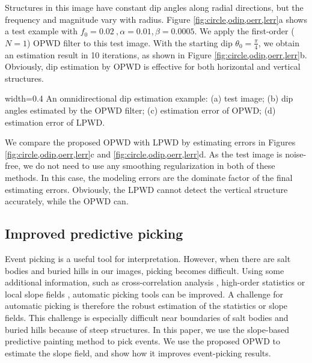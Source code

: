 Structures in this image have constant dip angles along radial directions,
but the frequency and magnitude vary with radius.
Figure \ref{fig:circle,odip,oerr,lerr}a shows a test example 
with $f_0=0.02~,\alpha=0.01,\beta=0.0005$. 
We apply the 
first-order ($N=1$) OPWD filter to this test image.
With the starting dip $\theta_0=\frac{\pi}{4}$,
we obtain an estimation result in 10 iterations,
as shown in Figure \ref{fig:circle,odip,oerr,lerr}b.
Obviously, dip estimation by OPWD is effective 
for both horizontal and vertical structures.

{width=0.4\textwidth}{
An omnidirectional dip estimation example:
(a) test image;
(b) dip angles estimated by the OPWD filter;
(c) estimation error of OPWD;
(d) estimation error of LPWD.
}


We compare the proposed OPWD with LPWD by 
estimating errors in Figures
\ref{fig:circle,odip,oerr,lerr}c and \ref{fig:circle,odip,oerr,lerr}d.
As the test image is noise-free, 
we do not need to use any smoothing regularization 
in both of these methods.
In this case, 
the modeling errors are the dominate factor of the final estimating errors.
Obviously, the LPWD cannot detect 
the vertical structure accurately,
while the OPWD can. 


\subsection{Improved predictive  picking}

Event picking is a useful tool for interpretation.
However, when there are
salt bodies and buried hills in our images,
picking becomes difficult.
Using some additional information,
such as cross-correlation analysis \cite[]{yung:1947},
high-order statistics \cite[]{GPR:GPR231}
or local slope fields \cite[]{fomel:A25},
automatic picking tools can be improved.
A challenge for automatic picking is 
therefore the robust estimation of the statistics 
or slope fields.
This challenge 
is especially difficult near boundaries of salt bodies and buried hills 
because of steep structures. 
In this paper, we use the slope-based predictive painting method 
\cite[]{fomel:A25} to pick events.
We use the proposed OPWD to estimate the slope field,
and show how it improves event-picking results.


